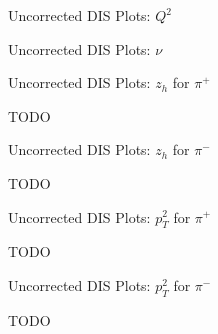 \begin{frame}{Uncorrected DIS Plots: $Q^2$}
    \label{20.10a::q2}

    \begin{figure}[t]
    \end{figure}

\end{frame}

\begin{frame}{Uncorrected DIS Plots: $\nu$}
    \label{20.10b::nu}

    \begin{figure}[t]
    \end{figure}

\end{frame}

\begin{frame}{Uncorrected DIS Plots: $z_h$ for $\pi^+$}
    \label{20.10c::zh_pi+}

    TODO

\end{frame}

\begin{frame}{Uncorrected DIS Plots: $z_h$ for $\pi^-$}
    \label{20.10d::zh_pi-}

    TODO

\end{frame}

\begin{frame}{Uncorrected DIS Plots: $p_T^2$ for $\pi^+$}
    \label{20.10e::pt2_pi+}

    TODO

\end{frame}

\begin{frame}{Uncorrected DIS Plots: $p_T^2$ for $\pi^-$}
    \label{20.10f::pt2_pi-}

    TODO

\end{frame}

